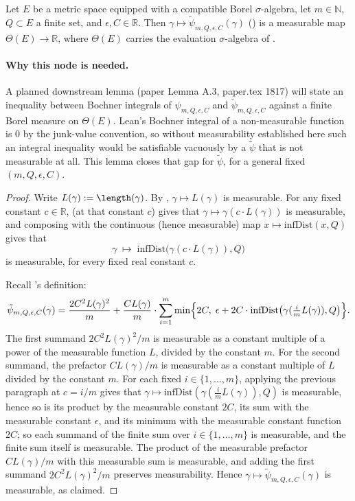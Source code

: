 \begin{lemma}
  Let $E$ be a metric space equipped with a compatible Borel $\sigma$-algebra, let
  $m \in \mathbb{N}$, $Q \subset E$ a finite set, and $\epsilon, C \in \mathbb{R}$. Then
  $\gamma \mapsto \tilde\psi_{m,Q,\epsilon,C}(\gamma)$ () is a measurable map
  $\Theta(E) \to \mathbb{R}$, where $\Theta(E)$ carries the evaluation $\sigma$-algebra of
  .

  \paragraph{Why this node is needed.} A planned downstream lemma (paper Lemma A.3, paper.tex 1817)
  will state an inequality between Bochner integrals of $\psi_{m,Q,\epsilon,C}$ and
  $\tilde\psi_{m,Q,\epsilon,C}$ against a finite Borel measure on $\Theta(E)$. Lean's Bochner
  integral of a non-measurable function is $0$ by the junk-value convention, so without
  measurability established here such an integral inequality would be satisfiable vacuously by a
  $\tilde\psi$ that is not measurable at all. This lemma closes that gap for $\tilde\psi$, for a
  general fixed $(m,Q,\epsilon,C)$.
\end{lemma}
\begin{proof}
  Write $L(\gamma) := \length(\gamma)$. By , $\gamma \mapsto L(\gamma)$
  is measurable. For any fixed constant $c \in \mathbb{R}$, 
  (at that constant $c$) gives that $\gamma \mapsto \gamma(c \cdot L(\gamma))$ is measurable, and
  composing with the continuous (hence measurable) map $x \mapsto \mathrm{infDist}(x,Q)$ gives that
  \[
    \gamma \;\longmapsto\; \mathrm{infDist}\bigl(\gamma(c \cdot L(\gamma)), Q\bigr)
  \]
  is measurable, for every fixed real constant $c$.

  Recall 's definition:
  \[
    \tilde\psi_{m,Q,\epsilon,C}(\gamma) = \frac{2C^2 L(\gamma)^2}{m}
      + \frac{C L(\gamma)}{m} \cdot \sum_{i=1}^{m} \min\Bigl\{ 2C,\;
        \epsilon + 2C\cdot\mathrm{infDist}\bigl(\gamma(\tfrac{i}{m}L(\gamma)),Q\bigr) \Bigr\}
    .
  \]
  The first summand $2C^2L(\gamma)^2/m$ is measurable as a constant multiple of a power of the
  measurable function $L$, divided by the constant $m$. For the second summand, the prefactor
  $CL(\gamma)/m$ is measurable as a constant multiple of $L$ divided by the constant $m$. For each
  fixed $i \in \{1,\dots,m\}$, applying the previous paragraph at $c = i/m$ gives that
  $\gamma \mapsto \mathrm{infDist}(\gamma(\tfrac{i}{m}L(\gamma)),Q)$ is measurable, hence so is its
  product by the measurable constant $2C$, its sum with the measurable constant $\epsilon$, and its
  minimum with the measurable constant function $2C$; so each summand of the finite sum over
  $i \in \{1,\dots,m\}$ is measurable, and the finite sum itself is measurable. The product of the
  measurable prefactor $CL(\gamma)/m$ with this measurable sum is measurable, and adding the first
  summand $2C^2L(\gamma)^2/m$ preserves measurability. Hence
  $\gamma \mapsto \tilde\psi_{m,Q,\epsilon,C}(\gamma)$ is measurable, as claimed.
\end{proof}
